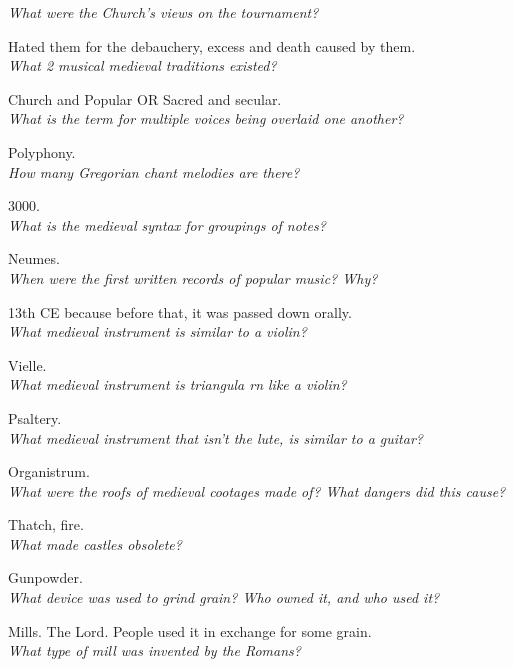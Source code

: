 \documentclass[12pt]{article}
\begin{document}
\textit{What were the Church's views on the tournament?}

Hated them for the debauchery, excess and death caused by them.\\

\textit{What 2 musical medieval traditions existed?}

Church and Popular OR Sacred and secular.\\

\textit{What is the term for multiple voices being overlaid one another?}

Polyphony.\\

\textit{How many Gregorian chant melodies are there?}

3000.\\

\textit{What is the medieval syntax for groupings of notes?}

Neumes.\\

\textit{When were the first written records of popular music? Why?}

13th CE because before that, it was passed down orally.\\

\textit{What medieval instrument is similar to a violin?}

Vielle.\\

\textit{What medieval instrument is triangula rn like a violin?}

Psaltery.\\

\textit{What medieval instrument that isn't the lute, is similar to a guitar?}

Organistrum.\\

\textit{What were the roofs of medieval cootages made of? What dangers did this cause?}

Thatch, fire.\\

\textit{What made castles obsolete?}

Gunpowder.\\

\textit{What device was used to grind grain? Who owned it, and who used it?}

Mills. The Lord. People used it in exchange for some grain. \\

\textit{What type of mill was invented by the Romans?}
\end{document}
